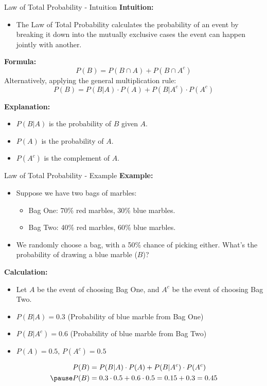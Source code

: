 \documentclass[handout]{beamer} %
\begin{document}
\begin{frame}{Law of Total Probability - Intuition}
    \textbf{Intuition:} \pause
    \begin{itemize}
        \item The Law of Total Probability calculates the probability of an event by breaking it down into the mutually exclusive cases the event can happen jointly with another.\pause
    \end{itemize}

    \textbf{Formula:}
    $$  P(B) = P(B \cap A) + P(B\cap A^c)  $$
    Alternatively, applying the general multiplication rule:
    $$ P(B) = P(B|A) \cdot P(A) + P(B|A^c) \cdot P(A^c) $$
    \pause

    \textbf{Explanation:}\pause
    \begin{itemize}
        \item \(P(B|A)\) is the probability of \(B\) given \(A\).\pause
        \item \(P(A)\) is the probability of \(A\).\pause
        \item \(P(A^c)\) is the complement of \(A\).
    \end{itemize}
\end{frame}

\begin{frame}{Law of Total Probability - Example}
    \textbf{Example:}\pause
    \begin{itemize}
        \item Suppose we have two bags of marbles:\pause
        \begin{itemize}
            \item Bag One: 70\% red marbles, 30\% blue marbles.\pause
            \item Bag Two: 40\% red marbles, 60\% blue marbles.\pause
        \end{itemize}
        \item We randomly choose a bag, with a 50\% chance of picking either. What's the probability of drawing a blue marble ($B$)?
    \end{itemize}\pause

    \textbf{Calculation:}\pause
    \begin{itemize}
        \item Let \(A\) be the event of choosing Bag One, and \(A^c\) be the event of choosing Bag Two.\pause
        \item \(P(B|A) = 0.3\) (Probability of blue marble from Bag One)\pause
        \item \(P(B|A^c) = 0.6\) (Probability of blue marble from Bag Two)\pause
        \item \(P(A) = 0.5\), \(P(A^c) = 0.5\)         \pause
    \end{itemize}
    \begin{align*}
        P(B) &= P(B|A) \cdot P(A) + P(B|A^c) \cdot P(A^c) \\ \pause
        P(B) &= 0.3 \cdot 0.5 + 0.6 \cdot 0.5 = 0.15 + 0.3 = 0.45
    \end{align*}
\end{frame}
\end{document}
